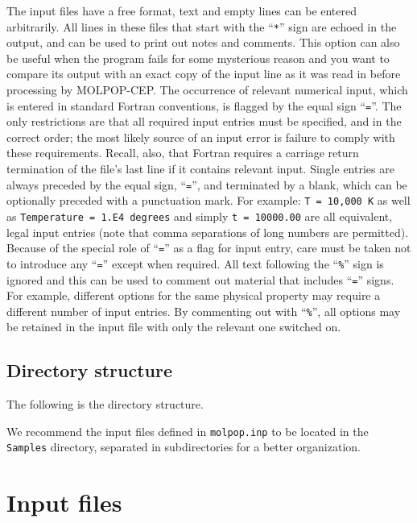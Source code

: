 \documentclass[12pt]{article}
\def\M{MOLPOP-CEP}
\begin{document}
The input files have a free format, text and empty lines can be entered
arbitrarily. All lines in these files that start with the ``\texttt{*}'' sign are echoed in
the output, and can be used to print out notes and comments. This option can
also be useful when the program fails for some mysterious reason and you want
to compare its output with an exact copy of the input line as it was read in
before processing by \M. The occurrence of relevant numerical input, which is
entered in standard Fortran conventions, is flagged by the equal sign
``\texttt{=}''. The only restrictions are that all required input entries must
be specified, and in the correct order; the most likely source of an input
error is failure to comply with these requirements.  Recall, also, that Fortran
requires a carriage return termination of the file's last line if it contains
relevant input. Single entries are always preceded by the equal sign,
``\texttt{=}'', and terminated by a blank, which can be optionally preceded
with a punctuation mark.  For example: \texttt{T = 10,000 K} as well as
\texttt{Temperature = 1.E4 degrees} and simply \texttt{t = 10000.00} are all
equivalent, legal input entries (note that comma separations of long numbers
are permitted).  Because of the special role of ``\texttt{=}'' as a flag for
input entry, care must be taken not to introduce any ``\texttt{=}'' except when
required.  All text following the ``\texttt{\%}'' sign is ignored and this can
be used to comment out material that includes ``\texttt{=}'' signs.  For
example, different options for the same physical property may require a
different number of input entries. By commenting out with ``\texttt{\%}'', all
options may be retained in the input file with only the relevant one switched
on.

\subsection{Directory structure}
The following is the directory structure.

We recommend the input files defined in \texttt{molpop.inp} to be located in the \texttt{Samples} directory, separated
in subdirectories for a better organization.

\section{Input files}
\end{document}
